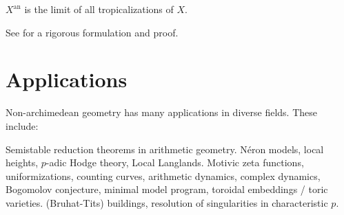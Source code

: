 \begin{theorem_}\label{thm:limit-tropicalizations}
$X^\mathrm{an}$ is the limit of all tropicalizations of $X$. 
\end{theorem_}

See \cite{payne-2009} for a rigorous formulation and proof. 





\section{Applications}

Non-archimedean geometry has many applications in diverse fields. These 
include: 

Semistable reduction theorems in arithmetic geometry. N\'eron models, 
local heights, $p$-adic Hodge theory, Local Langlands. Motivic zeta 
functions, uniformizations, counting curves, arithmetic dynamics, 
complex dynamics, Bogomolov conjecture, minimal model program, 
toroidal embeddings / toric varieties. (Bruhat-Tits) buildings, resolution 
of singularities in characteristic $p$. 




